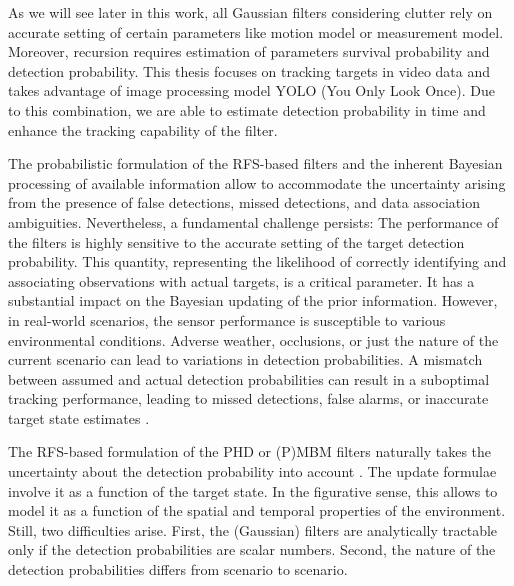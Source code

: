 As we will see later in this work, all Gaussian filters considering clutter rely on accurate setting of certain parameters like motion model or measurement model. Moreover, recursion requires estimation of parameters survival probability and detection probability. This thesis focuses on tracking targets in video data and takes advantage of image processing model YOLO (You Only Look Once). Due to this combination, we are able to estimate detection probability in time and enhance the tracking capability of the filter.

The probabilistic formulation of the RFS-based filters and the inherent Bayesian processing of available information allow to accommodate the uncertainty arising from the presence of false detections, missed detections, and data association ambiguities. Nevertheless, a fundamental challenge persists: The performance of the filters is highly sensitive to the accurate setting of the target detection probability. This quantity, representing the likelihood of correctly identifying and associating observations with actual targets, is a critical parameter. It has a substantial impact on the Bayesian updating of the prior information.
However, in real-world scenarios, the sensor performance is susceptible to various environmental conditions. Adverse weather, occlusions, or just the nature of the current scenario can lead to variations in detection probabilities. A mismatch between assumed and actual detection probabilities can result in a suboptimal tracking performance, leading to missed detections, false alarms, or inaccurate target state estimates \cite{Hendeby2014Gaussian}.

The RFS-based formulation of the PHD or (P)MBM filters naturally takes the uncertainty about the detection probability into account \cite{Hendeby2014Gaussian}. The update formulae involve it as a function of the target state. In the figurative sense, this allows to model it as a function of the spatial and temporal properties of the environment.
Still, two difficulties arise. First, the (Gaussian) filters are analytically tractable only if the detection probabilities are scalar numbers. Second, the nature of the detection probabilities differs from scenario to scenario.

